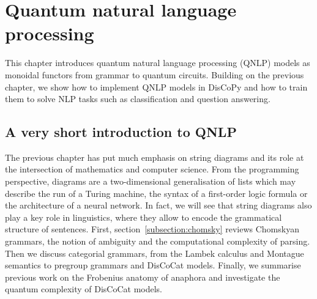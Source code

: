
\chapter{Quantum natural language processing} \label{chapter-2:qnlp}

This chapter introduces quantum natural language processing (QNLP) models as monoidal functors from grammar to quantum circuits.
Building on the previous chapter, we show how to implement QNLP models in DisCoPy and how to train them to solve NLP tasks such as classification and question answering.

\section{A very short introduction to QNLP}\label{section:NLP}

The previous chapter has put much emphasis on string diagrams and its role at the intersection of mathematics and computer science.
From the programming perspective, diagrams are a two-dimensional generalisation of lists which may describe the run of a Turing machine, the syntax of a first-order logic formula or the architecture of a neural network.
In fact, we will see that string diagrams also play a key role in linguistics, where they allow to encode the grammatical structure of sentences.
First, section~\ref{subsection:chomsky} reviews Chomskyan grammars, the notion of ambiguity and the computational complexity of parsing.
Then we discuss categorial grammars, from the Lambek calculus and Montague semantics to pregroup grammars and DisCoCat models.
Finally, we summarise previous work on the Frobenius anatomy of anaphora and investigate the quantum complexity of DisCoCat models.
